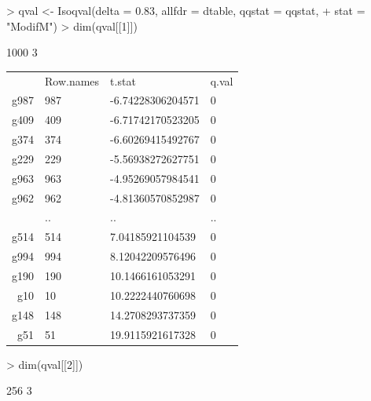\documentclass[10pt]{article}
\begin{document}
\begin{Schunk}
\begin{Sinput}
> qval <- Isoqval(delta = 0.83, allfdr = dtable, qqstat = qqstat, 
+     stat = "ModifM")
> dim(qval[[1]])
\end{Sinput}
\begin{Soutput}
[1] 1000    3
\end{Soutput}
\end{Schunk}

\begin{table}[!h]
\begin{left}
\begin{tabular}{rlll}
  & Row.names & t.stat & q.val \\ 
 g987 & 987 & -6.74228306204571 & 0 \\ 
  g409 & 409 & -6.71742170523205 & 0 \\ 
  g374 & 374 & -6.60269415492767 & 0 \\ 
  g229 & 229 & -5.56938272627751 & 0 \\ 
  g963 & 963 & -4.95269057984541 & 0 \\ 
  g962 & 962 & -4.81360570852987 & 0 \\ 
   & .. & .. & .. \\ 
  g514 & 514 & 7.04185921104539 & 0 \\ 
  g994 & 994 & 8.12042209576496 & 0 \\ 
  g190 & 190 & 10.1466161053291 & 0 \\ 
  g10 & 10 & 10.2222440760698 & 0 \\ 
  g148 & 148 & 14.2708293737359 & 0 \\ 
  g51 & 51 & 19.9115921617328 & 0 \\ 
  \end{tabular}
\end{left}
\end{table}
\begin{Schunk}
\begin{Sinput}
> dim(qval[[2]])
\end{Sinput}
\begin{Soutput}
[1] 256   3
\end{Soutput}
\end{Schunk}
\end{document}
